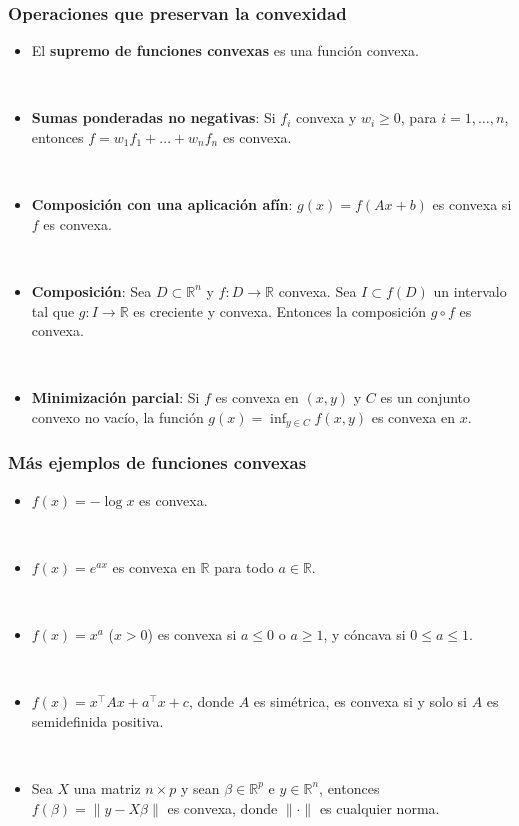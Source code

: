 \documentclass{beamer}
\begin{document}
\begin{frame}
\frametitle{Operaciones que preservan la convexidad}

\begin{itemize}

\item El \textbf{supremo de funciones convexas} es una función convexa.

\


\item \textbf{Sumas ponderadas no negativas}: Si $f_i$ convexa y $w_i\geq 0$, para $i=1,\ldots,n$, entonces $f=w_1f_1+\ldots + w_nf_n$ es convexa.

\

\item \textbf{Composición con una aplicación afín}: $g(x)=f(Ax+b)$ es convexa  si $f$ es convexa.

\




\item \textbf{Composición}: Sea $D\subset\mathbb{R}^n$ y $f:D\to \mathbb{R}$ convexa. Sea $I\subset f(D)$ un intervalo tal que $g:I\to \mathbb{R}$ es creciente y convexa. Entonces la composición $g\circ f$ es convexa. 

\

\item \textbf{Minimización parcial}: Si $f$ es convexa en $(x,y)$ y $C$ es un conjunto convexo no vacío, la función $g(x)=\inf_{y\in C} f(x,y)$ es convexa en $x$.

\end{itemize}



\end{frame}
\begin{frame}
\frametitle{Más ejemplos de funciones convexas}




\begin{itemize}


\item $f(x)=-\log x$ es convexa. 

\

\item $f(x)=e^{ax}$ es convexa en $\mathbb{R}$ para todo $a\in\mathbb{R}$. 

\

\item $f(x)=x^a$ ($x>0$) es convexa si $a\leq 0$ o $a\geq 1$, y cóncava si $0\leq a\leq 1$.

\

\item $f(x)=x^\top A x+ a^\top x + c$, donde $A$ es simétrica, es convexa si y solo si $A$ es semidefinida positiva.

\

\item Sea $X$ una matriz $n\times p$ y sean $\beta\in\mathbb{R}^p$ e $y\in\mathbb{R}^n$, entonces $f(\beta)=\|y-X\beta\|$ es convexa, donde $\|\cdot\|$ es cualquier norma.


\end{itemize}
\end{frame}
\end{document}
